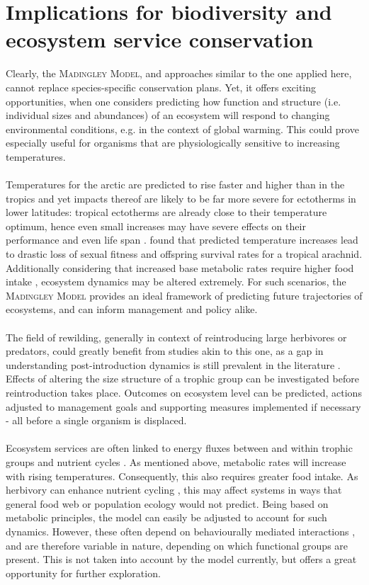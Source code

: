 \section{Implications for biodiversity and ecosystem service conservation }
Clearly, the \textsc{Madingley Model}, and approaches similar to the one applied here, cannot replace species-specific conservation  plans. Yet, it offers exciting opportunities, when one considers predicting how function and structure (i.e. individual sizes and abundances) of an ecosystem will respond to changing environmental conditions, e.g. in the context of global warming. This could prove especially useful for organisms that are physiologically sensitive to increasing temperatures.\\\\
Temperatures for the arctic are predicted to rise faster and higher than in the tropics   and yet impacts thereof are likely to be far more severe for ectotherms in lower latitudes: tropical ectotherms are already close to their temperature optimum, hence even small increases may have severe effects on their performance \citep{Deutsch2008} and even life span \citep[cf.][]{Speakman2005}. \cite{Zeh2012} found that predicted temperature increases lead to drastic loss of sexual fitness and offspring survival rates for a tropical arachnid. Additionally considering that increased base metabolic rates require higher food intake \citep{Dillon2010}, ecosystem dynamics may be altered extremely. For such scenarios, the \textsc{Madingley Model} provides an ideal framework of predicting future trajectories of ecosystems, and  can inform management and policy alike.\\\\
The field of rewilding, generally in context of reintroducing large herbivores or predators, could greatly benefit from studies akin to this one, as a gap in understanding post-introduction dynamics is still prevalent in the literature \citep[e.g.][]{Grange2012,Smit2015}. Effects of altering the size structure of a trophic group can be investigated before reintroduction takes place. Outcomes on ecosystem level can be predicted, actions adjusted to management goals and supporting measures implemented if necessary - all before a single organism is displaced. \\\\ 
Ecosystem services are often linked to energy fluxes between and within trophic groups and nutrient cycles \citep{Cardinale2012}. As mentioned above, metabolic rates will increase with rising temperatures. Consequently, this also requires greater food intake. As herbivory can enhance nutrient cycling \citep{Belovsky2000}, this may affect systems in ways that general food web or population ecology would not predict. Being based on metabolic principles, the model can easily be adjusted to account for such dynamics. However, these often depend on behaviourally mediated interactions \citep{Hawlena2010}, and are therefore variable in nature, depending on which functional groups are present. This is not taken into account by the model currently, but offers a great opportunity for further exploration.
